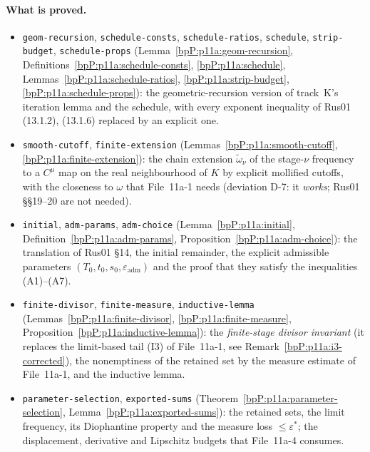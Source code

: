 \paragraph{What is proved.}
\begin{itemize}
\item \texttt{geom-recursion}, \texttt{schedule-consts}, \texttt{schedule-ratios}, \texttt{schedule}, \texttt{strip-budget}, \texttt{schedule-props} (Lemma~\ref{bpP:p11a:geom-recursion}, Definitions~\ref{bpP:p11a:schedule-consts}, \ref{bpP:p11a:schedule}, Lemmas~\ref{bpP:p11a:schedule-ratios}, \ref{bpP:p11a:strip-budget}, \ref{bpP:p11a:schedule-props}): the geometric-recursion version of track~K's iteration lemma and the schedule, with every exponent inequality of Rus01 (13.1.2), (13.1.6) replaced by an explicit one.
\item \texttt{smooth-cutoff}, \texttt{finite-extension} (Lemmas~\ref{bpP:p11a:smooth-cutoff}, \ref{bpP:p11a:finite-extension}): the chain extension $\tilde\omega_\nu$ of the stage-$\nu$ frequency to a $C^\mu$ map on the real neighbourhood of $K$ by explicit mollified cutoffs, with the closeness to $\omega$ that File~11a-1 needs (deviation D-7: it \emph{works}; Rus01 \S\S19--20 are not needed).
\item \texttt{initial}, \texttt{adm-params}, \texttt{adm-choice} (Lemma~\ref{bpP:p11a:initial}, Definition~\ref{bpP:p11a:adm-params}, Proposition~\ref{bpP:p11a:adm-choice}): the translation of Rus01 \S14, the initial remainder, the explicit admissible parameters $(T_0,t_0,s_0,\varepsilon_{\mathrm{adm}})$ and the proof that they satisfy the inequalities (A1)--(A7).
\item \texttt{finite-divisor}, \texttt{finite-measure}, \texttt{inductive-lemma} (Lemmas~\ref{bpP:p11a:finite-divisor}, \ref{bpP:p11a:finite-measure}, Proposition~\ref{bpP:p11a:inductive-lemma}): the \emph{finite-stage divisor invariant} (it replaces the limit-based tail (I3) of File~11a-1, see Remark~\ref{bpP:p11a:i3-corrected}), the nonemptiness of the retained set by the measure estimate of File~11a-1, and the inductive lemma.
\item \texttt{parameter-selection}, \texttt{exported-sums} (Theorem~\ref{bpP:p11a:parameter-selection}, Lemma~\ref{bpP:p11a:exported-sums}): the retained sets, the limit frequency, its Diophantine property and the measure loss $\le\varepsilon^*$; the displacement, derivative and Lipschitz budgets that File~11a-4 consumes.
\end{itemize}

